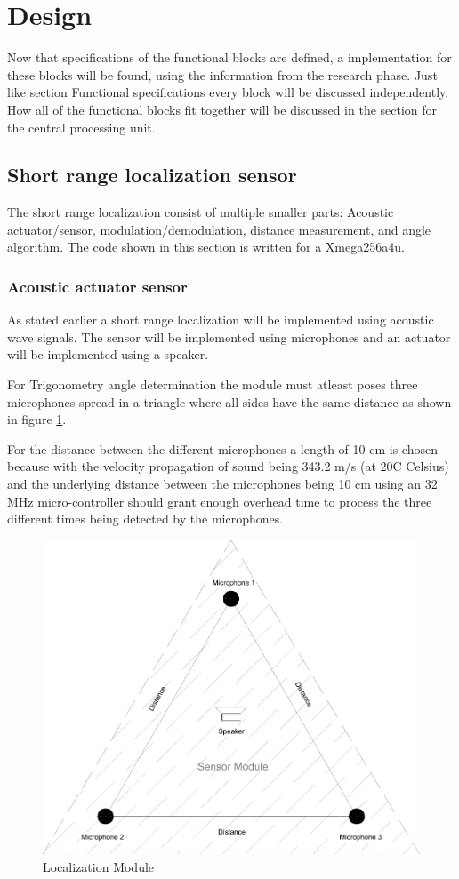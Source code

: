 \documentclass[10pt,a4paper]{article}
\begin{document}
\section{Design}
Now that specifications of the functional blocks are defined, a implementation for these blocks will be found, using the information from the research phase. Just like section Functional specifications every block will be discussed independently. How all of the functional blocks fit together will be discussed in the section for the central processing unit.


\subsection{Short range localization sensor}
The short range localization consist of multiple smaller parts: Acoustic actuator/sensor, modulation/demodulation, distance measurement, and angle algorithm. The code shown in this section is written for a Xmega256a4u.

\subsubsection{Acoustic actuator sensor}
As stated earlier a short range localization will be implemented using acoustic wave signals. The sensor will be implemented using microphones and an actuator will be implemented using a speaker. 

For Trigonometry angle determination the module must atleast poses three microphones spread in a triangle where all sides have the same distance as shown in figure \ref{module}.

For the distance between the different microphones a length of 10 cm is chosen because with the velocity propagation of sound being 343.2 m/s (at 20\degree C Celsius) and the underlying distance between the microphones being 10 cm using an 32 MHz micro-controller should grant enough overhead time to process the three different times being detected by the microphones. 

\begin{figure}[H]
\centering
\includegraphics[width=1\textwidth]{Module.pdf}
\caption{Localization Module}
\label{module}
\end{figure}
\end{document}
